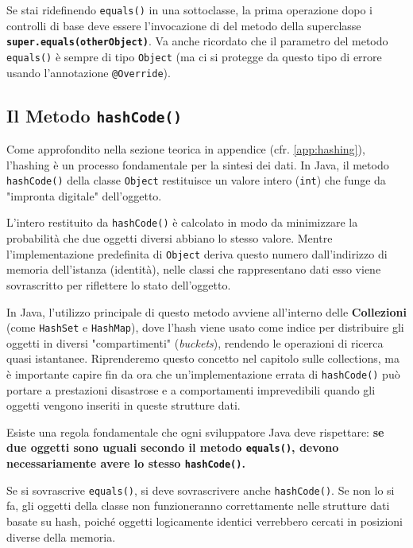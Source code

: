 \begin{warningbox}[Sottoclassi]
    Se stai ridefinendo \texttt{equals()} in una sottoclasse, la prima operazione dopo i controlli di base deve essere l'invocazione di del metodo della superclasse \textbf{\texttt{super.equals(otherObject)}}. Va anche ricordato che il parametro del metodo \texttt{equals()} è sempre di tipo \texttt{Object} (ma ci si protegge da questo tipo di errore usando l'annotazione \texttt{@Override}).
\end{warningbox}

\subsection{Il Metodo \texttt{hashCode()}}

Come approfondito nella sezione teorica in appendice (cfr. \ref{app:hashing}), l'hashing è un processo fondamentale per la sintesi dei dati. In Java, il metodo \texttt{hashCode()} della classe \texttt{Object} restituisce un valore intero (\texttt{int}) che funge da "impronta digitale" dell'oggetto.

L'intero restituito da \texttt{hashCode()} è calcolato in modo da minimizzare la probabilità che due oggetti diversi abbiano lo stesso valore. Mentre l'implementazione predefinita di \texttt{Object} deriva questo numero dall'indirizzo di memoria dell'istanza (identità), nelle classi che rappresentano dati esso viene sovrascritto per riflettere lo stato dell'oggetto.


In Java, l'utilizzo principale di questo metodo avviene all'interno delle \textbf{Collezioni} (come \texttt{HashSet} e \texttt{HashMap}), dove l'hash viene usato come indice per distribuire gli oggetti in diversi "compartimenti" (\textit{buckets}), rendendo le operazioni di ricerca quasi istantanee. Riprenderemo questo concetto nel capitolo sulle collections, ma è importante capire fin da ora che un'implementazione errata di \texttt{hashCode()} può portare a prestazioni disastrose e a comportamenti imprevedibili quando gli oggetti vengono inseriti in queste strutture dati.

Esiste una regola fondamentale che ogni sviluppatore Java deve rispettare: \textbf{se due oggetti sono uguali secondo il metodo \texttt{equals()}, devono necessariamente avere lo stesso \texttt{hashCode()}.}

\begin{warningbox}
    Se si sovrascrive \texttt{equals()}, si deve sovrascrivere anche \texttt{hashCode()}. Se non lo si fa, gli oggetti della classe non funzioneranno correttamente nelle strutture dati basate su hash, poiché oggetti logicamente identici verrebbero cercati in posizioni diverse della memoria.
\end{warningbox}

